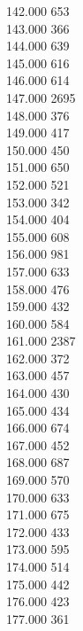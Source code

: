 { 142.000	653 \\
 143.000	366 \\
 144.000	639 \\
 145.000	616 \\
 146.000	614 \\
 147.000	2695 \\
 148.000	376 \\
 149.000	417 \\
 150.000	450 \\
 151.000	650 \\
 152.000	521 \\
 153.000	342 \\
 154.000	404 \\
 155.000	608 \\
 156.000	981 \\
 157.000	633 \\
 158.000	476 \\
 159.000	432 \\
 160.000	584 \\
 161.000	2387 \\
 162.000	372 \\
 163.000	457 \\
 164.000	430 \\
 165.000	434 \\
 166.000	674 \\
 167.000	452 \\
 168.000	687 \\
 169.000	570 \\
 170.000	633 \\
 171.000	675 \\
 172.000	433 \\
 173.000	595 \\
 174.000	514 \\
 175.000	442 \\
 176.000	423 \\
 177.000	361 \\
}
